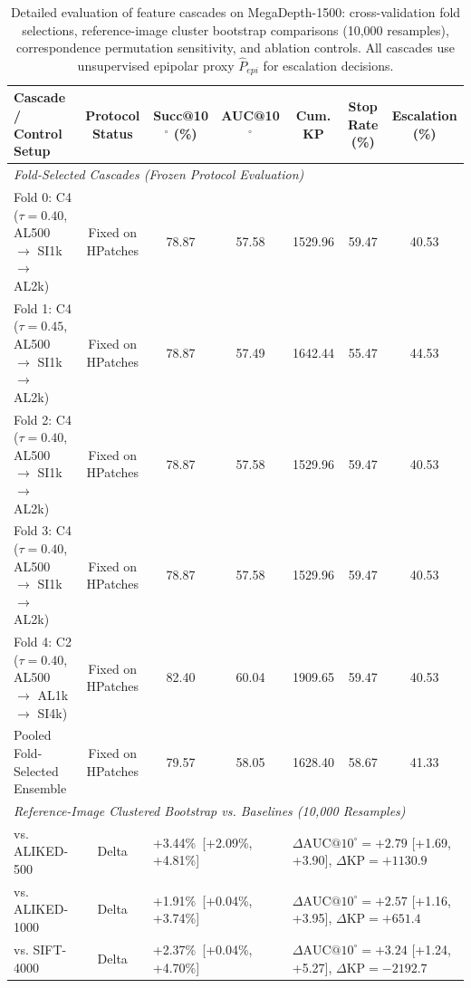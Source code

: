 \documentclass[conference]{IEEEtran}
\begin{document}
\begin{table}[t]
\centering
\setlength{\tabcolsep}{2.5pt}
\footnotesize
\caption{Detailed evaluation of feature cascades on MegaDepth-1500: cross-validation fold selections, reference-image cluster bootstrap comparisons (10,000 resamples), correspondence permutation sensitivity, and ablation controls. All cascades use unsupervised epipolar proxy $\hat{P}_{epi}$ for escalation decisions.}
\label{tab:cascade_results}
\begin{tabular}{lcccccc}
\hline
\textbf{Cascade / Control Setup} & \textbf{Protocol Status} & \textbf{Succ@10$^\circ$ (\%)} & \textbf{AUC@10$^\circ$} & \textbf{Cum. KP} & \textbf{Stop Rate (\%)} & \textbf{Escalation (\%)} \\
\hline
\multicolumn{7}{l}{\textit{Fold-Selected Cascades (Frozen Protocol Evaluation)}} \\
Fold 0: C4 ($\tau=0.40$, AL500 $\to$ SI1k $\to$ AL2k) & Fixed on HPatches & 78.87 & 57.58 & 1529.96 & 59.47 & 40.53 \\
Fold 1: C4 ($\tau=0.45$, AL500 $\to$ SI1k $\to$ AL2k) & Fixed on HPatches & 78.87 & 57.49 & 1642.44 & 55.47 & 44.53 \\
Fold 2: C4 ($\tau=0.40$, AL500 $\to$ SI1k $\to$ AL2k) & Fixed on HPatches & 78.87 & 57.58 & 1529.96 & 59.47 & 40.53 \\
Fold 3: C4 ($\tau=0.40$, AL500 $\to$ SI1k $\to$ AL2k) & Fixed on HPatches & 78.87 & 57.58 & 1529.96 & 59.47 & 40.53 \\
Fold 4: C2 ($\tau=0.40$, AL500 $\to$ AL1k $\to$ SI4k) & Fixed on HPatches & 82.40 & 60.04 & 1909.65 & 59.47 & 40.53 \\
Pooled Fold-Selected Ensemble & Fixed on HPatches & 79.57 & 58.05 & 1628.40 & 58.67 & 41.33 \\
\hline
\multicolumn{7}{l}{\textit{Reference-Image Clustered Bootstrap vs. Baselines (10,000 Resamples)}} \\
vs. ALIKED-500 & Delta & \multicolumn{2}{l}{+3.44\%\ [+2.09\%, +4.81\%]} & \multicolumn{3}{l}{$\Delta\text{AUC}@10^\circ = +2.79$ [+1.69, +3.90], $\Delta\text{KP} = +1130.9$} \\
vs. ALIKED-1000 & Delta & \multicolumn{2}{l}{+1.91\%\ [+0.04\%, +3.74\%]} & \multicolumn{3}{l}{$\Delta\text{AUC}@10^\circ = +2.57$ [+1.16, +3.95], $\Delta\text{KP} = +651.4$} \\
vs. SIFT-4000 & Delta & \multicolumn{2}{l}{+2.37\%\ [+0.04\%, +4.70\%]} & \multicolumn{3}{l}{$\Delta\text{AUC}@10^\circ = +3.24$ [+1.24, +5.27], $\Delta\text{KP} = -2192.7$} \\

\end{tabular}
\end{table}
\end{document}
